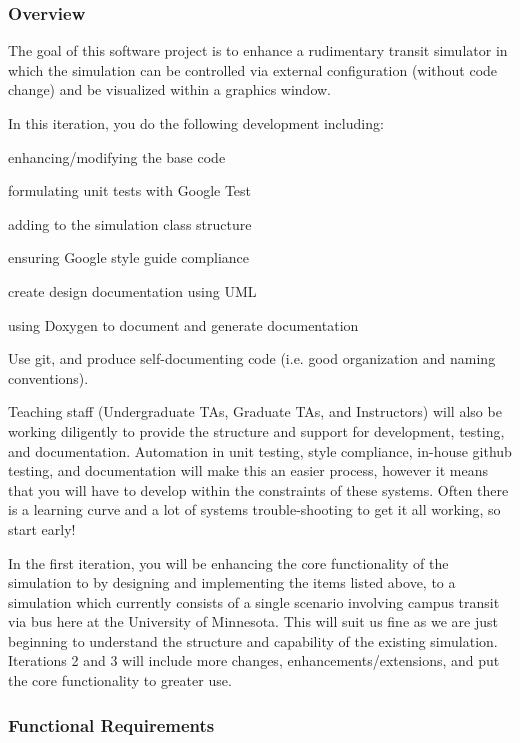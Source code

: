 \subsubsection*{Overview}

The goal of this software project is to enhance a rudimentary transit simulator in which the simulation can be controlled via external configuration (without code change) and be visualized within a graphics window.

In this iteration, you do the following development including\+:


\begin{DoxyItemize}
\item enhancing/modifying the base code
\item formulating unit tests with Google Test
\item adding to the simulation class structure
\item ensuring Google style guide compliance
\item create design documentation using U\+ML
\item using Doxygen to document and generate documentation
\item Use git, and produce self-\/documenting code (i.\+e. good organization and naming conventions).
\end{DoxyItemize}

Teaching staff (Undergraduate TA\textquotesingle{}s, Graduate TA\textquotesingle{}s, and Instructors) will also be working diligently to provide the structure and support for development, testing, and documentation. Automation in unit testing, style compliance, in-\/house github testing, and documentation will make this an easier process, however it means that you will have to develop within the constraints of these systems. Often there is a learning curve and a lot of systems trouble-\/shooting to get it all working, so start early!

In the first iteration, you will be enhancing the core functionality of the simulation to by designing and implementing the items listed above, to a simulation which currently consists of a single scenario involving campus transit via bus here at the University of Minnesota. This will suit us fine as we are just beginning to understand the structure and capability of the existing simulation. Iterations 2 and 3 will include more changes, enhancements/extensions, and put the core functionality to greater use.

\subsubsection*{Functional Requirements}

